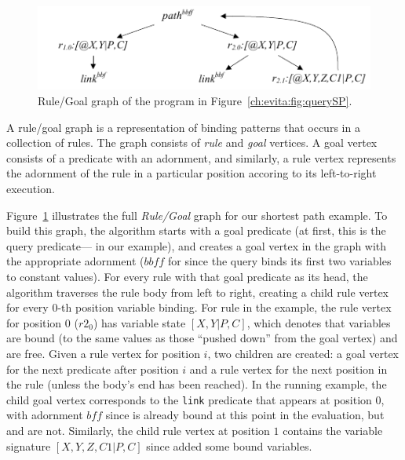 \begin{figure}[!t]
\begin{center}
\includegraphics[scale=1.8]{figures/RuleGoalGraph}
\caption{Rule/Goal graph of the program in Figure~\ref{ch:evita:fig:querySP}.}
\label{ch:evita:fig:rggraph}
\end{center}
\end{figure}

A rule/goal graph is a representation of binding patterns that occurs in a
collection of rules.  The graph consists of \emph{rule} and \emph{goal}
vertices.  A goal vertex consists of a predicate with an adornment, and
similarly, a rule vertex represents the adornment of the rule in a particular
position accoring to its left-to-right execution.

Figure~\ref{ch:evita:fig:rggraph} illustrates the full {\em Rule/Goal} graph
for our shortest path example.  To build this graph, the algorithm starts with
a goal predicate (at first, this is the query predicate--- in our
example), and creates a goal vertex in the graph with the appropriate adornment
($\mathit{bbff}$ for  since the query binds its first two variables to
constant values).  For every rule with that goal predicate as its head, the
algorithm traverses the rule body from left to right, creating a child rule
vertex for every $0$-th position variable binding.  For rule  in the
example, the rule vertex for position $0$ ($r2_0$) has variable state
$[X,Y|P,C]$, which denotes that variables  are bound (to the same
values as those ``pushed down'' from the goal vertex) and  are free.
Given a rule vertex for position $i$, two children are created: a goal vertex
for the next predicate after position $i$ and a rule vertex for the next
position in the rule (unless the body's end has been reached).  In the running
example, the child goal vertex corresponds to the {\tt link} predicate that
appears at position $0$, with adornment $\mathit{bff}$ since  is already
bound at this point in the evaluation, but  and  are not.
Similarly, the child rule vertex at position $1$ contains the variable
signature $[X,Y,Z,C1|P,C]$ since  added some bound variables.  

